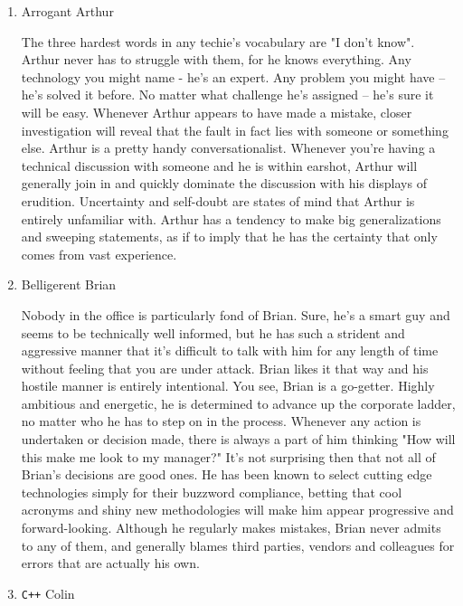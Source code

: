 \documentclass{article}
\begin{document}
\begin{enumerate}
\item Arrogant Arthur
\label{sec:orgheadline4}

The three hardest words in any techie's vocabulary are "I don't know".
Arthur never has to struggle with them, for he knows everything. Any
technology you might name - he's an expert. Any problem you might have
-- he's solved it before. No matter what challenge he's assigned -- he's
sure it will be easy. Whenever Arthur appears to have made a mistake,
closer investigation will reveal that the fault in fact lies with
someone or something else. Arthur is a pretty handy conversationalist.
Whenever you're having a technical discussion with someone and he is
within earshot, Arthur will generally join in and quickly dominate the
discussion with his displays of erudition. Uncertainty and self-doubt
are states of mind that Arthur is entirely unfamiliar with. Arthur has a
tendency to make big generalizations and sweeping statements, as if to
imply that he has the certainty that only comes from vast experience.

\item Belligerent Brian
\label{sec:orgheadline5}

Nobody in the office is particularly fond of Brian. Sure, he's a smart
guy and seems to be technically well informed, but he has such a
strident and aggressive manner that it's difficult to talk with him for
any length of time without feeling that you are under attack. Brian
likes it that way and his hostile manner is entirely intentional. You
see, Brian is a go-getter. Highly ambitious and energetic, he is
determined to advance up the corporate ladder, no matter who he has to
step on in the process. Whenever any action is undertaken or decision
made, there is always a part of him thinking "How will this make me look
to my manager?" It's not surprising then that not all of Brian's
decisions are good ones. He has been known to select cutting edge
technologies simply for their buzzword compliance, betting that cool
acronyms and shiny new methodologies will make him appear progressive
and forward-looking. Although he regularly makes mistakes, Brian never
admits to any of them, and generally blames third parties, vendors and
colleagues for errors that are actually his own.

\item \texttt{C++} Colin
\label{sec:orgheadline6}


\end{enumerate}
\end{document}
